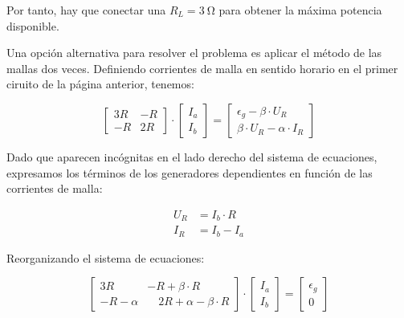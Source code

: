 \vspace{2mm}
Por tanto, hay que conectar una $\boxed{R_L = \qty{3}{\ohm}}$ para obtener la máxima potencia disponible.

\newpage

Una opción alternativa para resolver el problema es aplicar el método de las mallas dos veces. Definiendo corrientes de malla en sentido horario en el primer ciruito de la página anterior, tenemos:

\begin{equation*}
  \begin{bmatrix}
    3R & -R\\[4pt]
    -R & 2R
  \end{bmatrix} \cdot %
  \begin{bmatrix}
    I_a\\[4pt]
    I_b
  \end{bmatrix} = %
  \begin{bmatrix}
    \epsilon_g - \beta \cdot U_R\\[4pt]
    \beta \cdot U_R - \alpha \cdot I_R
  \end{bmatrix}
\end{equation*}

\vspace{4mm}
Dado que aparecen incógnitas en el lado derecho del sistema de ecuaciones, expresamos los términos de los generadores dependientes en función de las corrientes de malla:

\vspace{-4mm}
\begin{align*}
    U_R &= I_b \cdot R\\[3pt]
    I_R &= I_b - I_a
\end{align*}

Reorganizando el sistema de ecuaciones:

\begin{equation*}
  \begin{bmatrix}
    3R & -R + \beta \cdot R\\[4pt]
    -R - \alpha & \quad 2R + \alpha - \beta \cdot R
  \end{bmatrix} \cdot %
  \begin{bmatrix}
    I_a\\[4pt]
    I_b
  \end{bmatrix} = %
  \begin{bmatrix}
    \epsilon_g\\[4pt]
    0
  \end{bmatrix}
\end{equation*}

